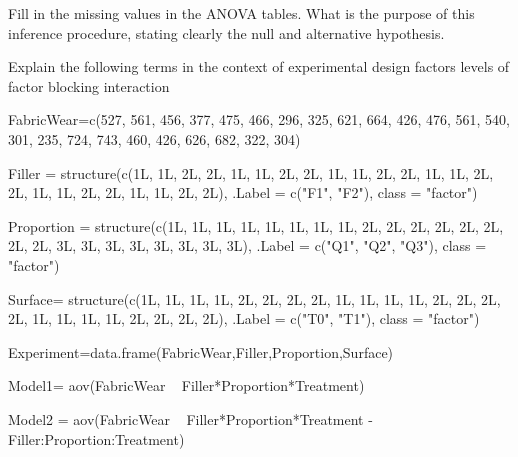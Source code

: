 \documentclass{article}
\begin{document}
Fill in the missing values in the ANOVA tables. What is the purpose of this inference procedure, stating clearly the null and 
alternative hypothesis.

Explain the following terms in the context of experimental design
factors
levels of factor
blocking 
interaction


FabricWear=c(527, 561, 456, 377, 475, 466, 296, 325, 
621, 664, 426, 476, 561, 540, 301, 235, 
724, 743, 460, 426, 626, 682, 322, 304) 

Filler = structure(c(1L, 1L, 2L, 2L, 1L, 1L, 2L, 2L, 1L, 1L, 2L, 2L, 1L, 
1L, 2L, 2L, 1L, 1L, 2L, 2L, 1L, 1L, 2L, 2L), .Label = c("F1", 
"F2"), class = "factor")

Proportion = structure(c(1L, 1L, 1L, 1L, 1L, 1L, 1L, 1L, 2L, 2L, 2L, 2L, 2L, 
2L, 2L, 2L, 3L, 3L, 3L, 3L, 3L, 3L, 3L, 3L), .Label = c("Q1", 
"Q2", "Q3"), class = "factor")

Surface= structure(c(1L, 1L, 1L, 1L, 2L, 2L, 2L, 2L, 1L, 1L, 1L, 1L, 2L, 
2L, 2L, 2L, 1L, 1L, 1L, 1L, 2L, 2L, 2L, 2L), .Label = c("T0", 
"T1"), class = "factor")

Experiment=data.frame(FabricWear,Filler,Proportion,Surface)

Model1= aov(FabricWear ~ Filler*Proportion*Treatment)

Model2 = aov(FabricWear ~ Filler*Proportion*Treatment - Filler:Proportion:Treatment)
\end{document}
